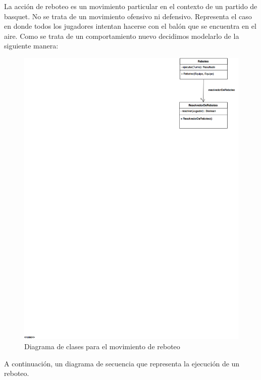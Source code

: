 La acción de reboteo es un movimiento particular en el contexto de un partido de basquet. No se trata de un movimiento ofensivo ni defensivo.
Representa el caso en donde todos los jugadores intentan hacerse con el balón que se encuentra en el aire. Como se trata de un comportamiento nuevo decidimos
modelarlo de la siguiente manera:

\begin{figure}[h!]
  \includegraphics[scale=0.25]{imagenes/diagrama-clases-reboteo.png}
  \caption{Diagrama de clases para el movimiento de reboteo}
\end{figure}

A continuación, un diagrama de secuencia que representa la ejecución de un reboteo.

